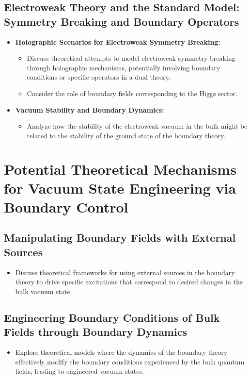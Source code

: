 \documentclass{amsart}
\begin{document}
\subsection{Electroweak Theory and the Standard Model: Symmetry Breaking and Boundary Operators}
\begin{itemize}
    \item \textbf{Holographic Scenarios for Electroweak Symmetry Breaking:}
        \begin{itemize}
            \item Discuss theoretical attempts to model electroweak symmetry breaking through holographic mechanisms, potentially involving boundary conditions or specific operators in a dual theory.
            \item Consider the role of boundary fields corresponding to the Higgs sector.
        \end{itemize}
    \item \textbf{Vacuum Stability and Boundary Dynamics:}
        \begin{itemize}
            \item Analyze how the stability of the electroweak vacuum in the bulk might be related to the stability of the ground state of the boundary theory.
        \end{itemize}
\end{itemize}

\section{Potential Theoretical Mechanisms for Vacuum State Engineering via Boundary Control}

\subsection{Manipulating Boundary Fields with External Sources}
\begin{itemize}
    \item Discuss theoretical frameworks for using external sources in the boundary theory to drive specific excitations that correspond to desired changes in the bulk vacuum state.
\end{itemize}

\subsection{Engineering Boundary Conditions of Bulk Fields through Boundary Dynamics}
\begin{itemize}
    \item Explore theoretical models where the dynamics of the boundary theory effectively modify the boundary conditions experienced by the bulk quantum fields, leading to engineered vacuum states.
\end{itemize}
\end{document}
